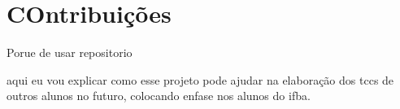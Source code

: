 \section{COntribuições}
Porue de usar repositorio

aqui eu vou explicar como esse projeto pode ajudar na elaboração dos tccs de outros alunos no futuro, colocando enfase nos alunos do ifba.